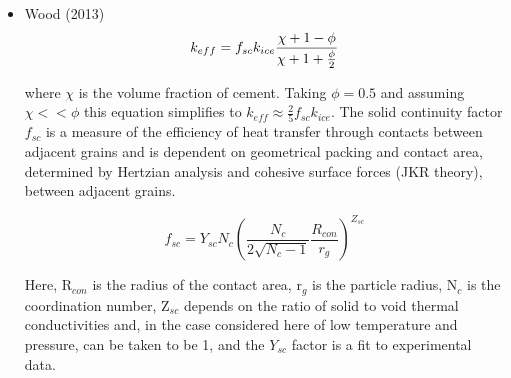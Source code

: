 \documentclass[11pt]{article} %
\begin{document}
	\begin{itemize}
	\item Wood (2013)
		\begin{equation}
		k_{eff}  = f_{sc} k_{ice} \frac{\chi + 1 - \phi}{\chi + 1 + \frac{\phi}{2}} \\
		\end{equation}
		
		where $\chi$ is the volume fraction of cement. Taking $\phi = 0.5$ and assuming $\chi << \phi$ this equation simplifies to $k_{eff} \approx \frac{2}{5} f_{sc} k_{ice}$.  The solid continuity factor $f_{sc}$ is a measure of the efficiency of heat transfer through contacts between adjacent grains and is dependent on geometrical packing and contact area, determined by Hertzian analysis and cohesive surface forces (JKR theory), between adjacent grains.
		
		\begin{equation}
		f_{sc} = Y_{sc}N_{c} \left( \frac{N_{c}}{2\sqrt{N_{c}-1}} \frac{R_{con}}{r_{g}} \right)^{Z_{sc}}
		\end{equation}
	
	Here, R$_{con}$ is the radius of the contact area, r$_{g}$ is the particle radius, N$_{c}$ is the coordination number, Z$_{sc}$ depends on the ratio of solid to void thermal conductivities and, in the case considered here of low temperature and pressure, can be taken to be 1, and the $Y_{sc}$ factor is a fit to experimental data. %
	
		


\end{itemize}
\end{document}
